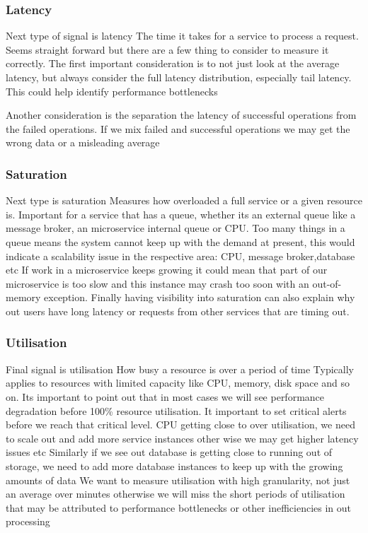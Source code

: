 \subsubsection{Latency}
Next type of signal is latency
The time it takes for a service to process a request.
Seems straight forward but there are a few thing to consider to measure it correctly.
The first important consideration is to not just look at the average latency, but always consider the full latency distribution, especially tail latency.
This could help identify performance bottlenecks

Another consideration is the separation the latency of successful operations from the failed operations.
If we mix failed and successful operations we may get the wrong data or a misleading average

\subsubsection{Saturation}
Next type is saturation
Measures how overloaded a full service or a given resource is.
Important for a service that has a queue, whether its an external queue like a message broker, an microservice internal queue or CPU.
Too many things in a queue means the system cannot keep up with the demand at present, this would indicate a scalability issue in the respective area: CPU, message broker,database etc
If work in a microservice keeps growing it could mean that part of our microservice is too slow and this instance may crash too soon with an out-of-memory exception.
Finally having visibility into saturation can also explain why out users have long latency or requests from other services that are timing out.

\subsubsection{Utilisation}
Final signal is utilisation
How busy a resource is over a period of time
Typically applies to resources with limited capacity like CPU, memory, disk space and so on.
Its important to point out that in most cases we will see performance degradation before 100\% resource utilisation.
It important to set critical alerts before we reach that critical level.
CPU getting close to over utilisation, we need to scale out and add more service instances other wise we may get higher latency issues etc
Similarly if we see out database is getting close to running out of storage, we need to add more database instances to keep up with the growing amounts of data
We want to measure utilisation with high granularity, not just an average over minutes otherwise we will miss the short periods of utilisation that may be attributed to performance bottlenecks or other inefficiencies in out processing

